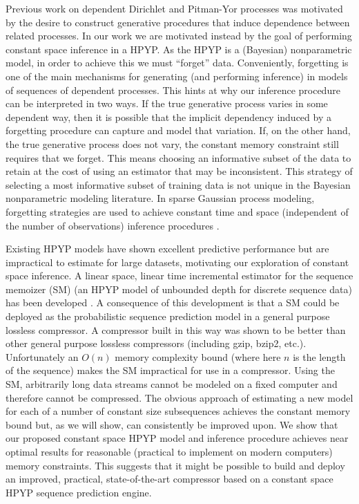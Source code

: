 Previous work on dependent Dirichlet and Pitman-Yor processes \cite{MacEachern2000, Srebro2005, Griffin2006, Caron2007, Caron2007a} was motivated by the desire to construct generative procedures that induce dependence between related processes.  In our work we are motivated instead by the goal of performing constant space inference in a HPYP.  As the HPYP is a (Bayesian) nonparametric model, in order to achieve this we must ``forget'' data.  Conveniently, forgetting is one of the main mechanisms for generating (and performing inference) in models of sequences of dependent processes.  This hints at why our inference procedure can be interpreted in two ways.  If the true generative process varies in some dependent way, then it is possible that the implicit dependency induced by a forgetting procedure can capture and model that variation.  If, on the other hand, the true generative process does not vary, the constant memory constraint still requires that we forget.  This means choosing an informative subset of the data to retain at the cost of using an estimator that may be inconsistent.  This strategy of selecting a most informative subset of training data is not unique in the Bayesian nonparametric modeling literature.  In sparse Gaussian process modeling, forgetting strategies are used to achieve constant time and space (independent of the number of observations) inference procedures \cite{ Lawrence2003, Csat'o2002, Snelson2006}.

 
Existing HPYP models have shown excellent predictive performance but are impractical to estimate for large datasets, motivating our exploration of constant space inference.  A linear space, linear time incremental estimator for the sequence memoizer (SM) \cite{Wood2009} (an HPYP model of unbounded depth for discrete sequence data) has been developed \cite{Gasthaus2010}.   A consequence of this development is that a SM could be deployed as the probabilistic sequence prediction model in a general purpose lossless compressor.   A compressor built in this way was shown to be better than other general purpose lossless compressors (including gzip, bzip2, etc.).  Unfortunately an $O(n)$ memory complexity bound (where here $n$ is the length of the sequence) makes the SM impractical for use in a compressor.  Using the SM, arbitrarily long data streams cannot be modeled on a fixed computer and therefore cannot be compressed.  The obvious approach of estimating a new model for each of a number of constant size subsequences achieves the constant memory bound but, as we will show, can consistently be improved upon.   We show that our proposed constant space HPYP model and inference procedure achieves near optimal results for reasonable (practical to implement on modern computers) memory constraints.  This suggests that it might be possible to build and deploy an improved, practical, state-of-the-art compressor based on a constant space HPYP sequence prediction engine.

